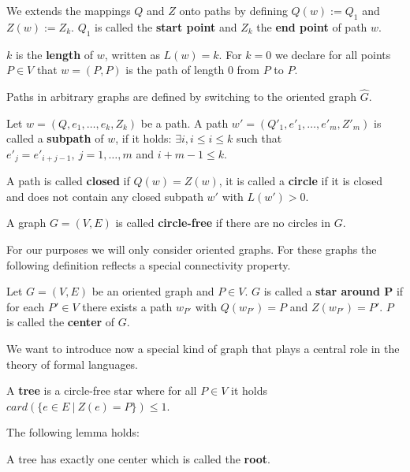 We extends the mappings $Q$ and $Z$ onto paths by defining $Q(w) := Q_1$ and
$Z(w) := Z_k$. $Q_1$ is called the {\bf start point} and $Z_k$ the {\bf end
point} of path $w$.

$k$ is the {\bf length} of $w$, written as $L(w) = k$. For $k = 0$ we declare
for all points $P \in V$ that $w = (P, P)$ is the path of length 0 from $P$ to
$P$.

Paths in arbitrary graphs are defined by switching to the oriented graph
$\hat{G}$.

\begin{definition}[subpath]
Let $w = (Q, e_1, \ldots, e_k, Z_k)$ be a path. A path $w' = (Q'_1, e'_1,
\ldots, e'_m, Z'_m)$ is called a {\bf subpath} of $w$, if it holds: $\exists i,
i \leq i \leq k$ such that $e'_j = e'_{i+j-1},\ j = 1, \ldots, m$ and $i + m -
1 \leq k$.
\end{definition}

A path is called {\bf closed} if $Q(w) = Z(w)$, it is called a {\bf circle} if
it is closed and does not contain any closed subpath $w'$ with $L(w') > 0$.

\begin{definition}
A graph $G = (V, E)$ is called {\bf circle-free} if there are no circles in $G$.
\end{definition}

For our purposes we will only consider oriented graphs. For these graphs the
following definition reflects a special connectivity property.

\begin{definition}
Let $G = (V, E)$ be an oriented graph and $P \in V$. $G$ is called a {\bf star
around P} if for each $P' \in V$ there exists a path $w_{P'}$ with $Q(w_{P'}) =
P$ and $Z(w_{P'}) = P'$. $P$ is called the {\bf center} of $G$.
\end{definition} 

We want to introduce now a special kind of graph that plays a central role in
the theory of formal languages.

\begin{definition}[tree]
A {\bf tree} is a circle-free star where for all $P \in V$ it holds $card(\{ e
\in E\ |\ Z(e) = P\}) \leq 1$.
\end{definition}

The following lemma holds:

\begin{lemma}
A tree has exactly one center which is called the {\bf root}.
\end{lemma}

